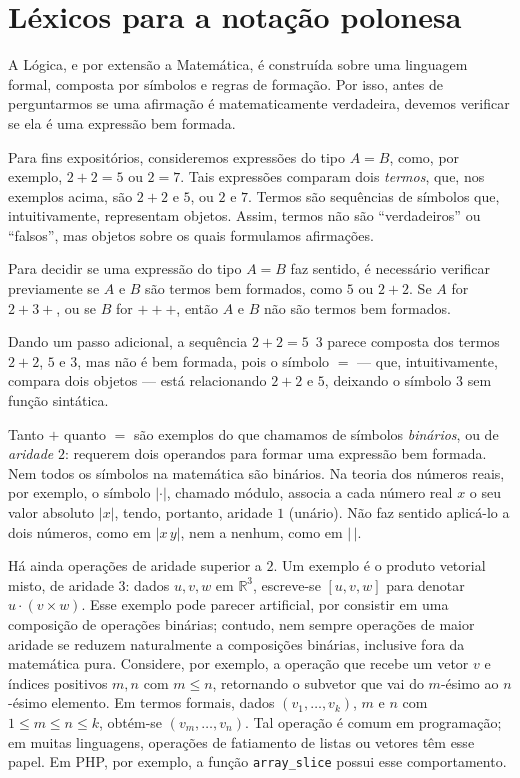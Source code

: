 \section{Léxicos para a notação polonesa}\label{sec:lexicosNotacaoPolonesa}
A Lógica, e por extensão a Matemática, é construída sobre uma linguagem formal, composta por símbolos e regras de formação.
Por isso, antes de perguntarmos se uma afirmação é matematicamente verdadeira, devemos verificar se ela é uma expressão bem formada.

Para fins expositórios, consideremos expressões do tipo $A=B$, como, por exemplo, $2+2=5$ ou $2=7$.
Tais expressões comparam dois \emph{termos}, que, nos exemplos acima, são $2+2$ e $5$, ou $2$ e $7$.
Termos são sequências de símbolos que, intuitivamente, representam objetos.
Assim, termos não são ``verdadeiros'' ou ``falsos'', mas objetos sobre os quais formulamos afirmações.

Para decidir se uma expressão do tipo $A=B$ faz sentido, é necessário verificar previamente se $A$ e $B$ são termos bem formados, como $5$ ou $2+2$.
Se $A$ for $2+3+$, ou se $B$ for $+++$, então $A$ e $B$ não são termos bem formados.

Dando um passo adicional, a sequência $2+2 = 5$~$3$ parece composta dos termos $2+2$, $5$ e $3$, mas não é bem formada, pois o símbolo $=$ --- que, intuitivamente, compara dois objetos --- está relacionando $2+2$ e $5$, deixando o símbolo $3$ sem função sintática.

Tanto $+$ quanto $=$ são exemplos do que chamamos de símbolos \emph{binários}, ou de \emph{aridade} $2$: requerem dois operandos para formar uma expressão bem formada.
Nem todos os símbolos na matemática são binários.
Na teoria dos números reais, por exemplo, o símbolo $|\cdot|$, chamado módulo, associa a cada número real $x$ o seu valor absoluto $|x|$, tendo, portanto, aridade $1$ (unário).
Não faz sentido aplicá-lo a dois números, como em $|x\,y|$, nem a nenhum, como em $|\,|$.

Há ainda operações de aridade superior a $2$.
Um exemplo é o produto vetorial misto, de aridade $3$: dados $u,v,w$ em $\mathbb R^3$, escreve-se $[u,v,w]$ para denotar $u\cdot(v\times w)$.
Esse exemplo pode parecer artificial, por consistir em uma composição de operações binárias; contudo, nem sempre operações de maior aridade se reduzem naturalmente a composições binárias, inclusive fora da matemática pura.
Considere, por exemplo, a operação que recebe um vetor $v$ e índices positivos $m,n$ com $m\leq n$, retornando o subvetor que vai do $m$-ésimo ao $n$-ésimo elemento.
Em termos formais, dados $(v_1,\dots,v_k)$, $m$ e $n$ com $1\leq m\leq n\leq k$, obtém-se $(v_m,\dots,v_n)$.
Tal operação é comum em programação; em muitas linguagens, operações de fatiamento de listas ou vetores têm esse papel.
Em PHP, por exemplo, a função \texttt{array\_slice} possui esse comportamento.

